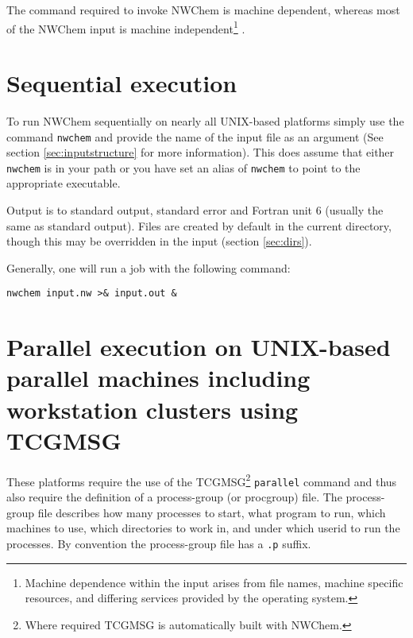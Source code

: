 %
%

The command required to invoke NWChem is machine dependent, whereas
most of the NWChem input is machine independent\footnote{Machine
dependence within the input arises from file names, machine
specific resources, and differing services provided by the operating system.} .

\section{Sequential execution}

To run NWChem sequentially on nearly all UNIX-based platforms simply
use the command \verb+nwchem+ and provide the name of the input file
as an argument (See section \ref{sec:inputstructure} for more information).
This does assume that either \verb+nwchem+ is in your path or you have
set an alias of \verb+nwchem+ to point to the appropriate executable.

Output is to standard output, standard error and Fortran unit 6
(usually the same as standard output).  Files are created by default
in the current directory, though this may be overridden in the input
(section \ref{sec:dirs}).

Generally, one will run a job with the following command:

\verb+nwchem input.nw >& input.out &+

\section{Parallel execution on UNIX-based parallel machines
including workstation clusters using TCGMSG}
\label{sec:procgrp}

 These platforms require the use of the TCGMSG\footnote{Where required
TCGMSG is automatically built with NWChem.} \verb+parallel+ command
and thus also require the definition of a process-group (or procgroup)
file.  The process-group file describes how many processes to start,
what program to run, which machines to use, which directories to work
in, and under which userid to run the processes.  By convention the
process-group file has a \verb+.p+ suffix.

